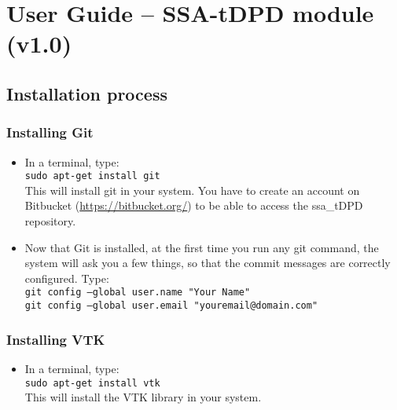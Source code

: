 \documentclass[a4paper,12pt,oneside]{report}
\makeatletter
\newcommand{\chapterauthor}[1]{%
  {\parindent0pt\vspace*{-5pt}%
  \linespread{1.1}\scshape#1%
  \par\nobreak\vspace*{25pt}}
  \@afterheading%
}
\makeatother
\begin{document}
\chapter*{User Guide -- SSA-tDPD module (v1.0)}


\section{Installation process}


\subsection{Installing Git}
\begin{itemize}
\item In a terminal, type: \\

 \texttt{sudo apt-get install git}\\
 
This will install git in your system. You have to create an account on Bitbucket (\url{https://bitbucket.org/}) to be able to access the ssa\_tDPD repository.


\item Now that Git is installed, at the first time you run any git command, the system will ask you a few things, so that the commit messages are correctly configured. Type:\\

 \texttt{git config --global user.name "Your Name"}\\
 
 \texttt{git config --global user.email "youremail@domain.com"}\\


\end{itemize}


\pagebreak




\subsection{Installing VTK}
\begin{itemize}
\item In a terminal, type: \\

 \texttt{sudo apt-get install vtk}\\
 
This will install the VTK library in your system.

\end{itemize}
\end{document}
